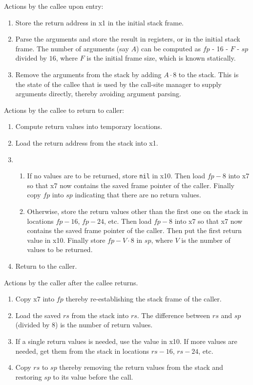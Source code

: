Actions by the callee upon entry:

\begin{enumerate}
\item Store the return address in x1 in the initial stack frame.
\item Parse the arguments and store the result in registers, or in the
  initial stack frame. The number of arguments (say $A$) can be
  computed as $fp$ - 16 - $F$ - $sp$ divided by $16$, where $F$ is the
  initial frame size, which is known statically.
\item Remove the arguments from the stack by adding $A \cdot 8$ to the
  stack.  This is the state of the callee that is used by the
  call-site manager to supply arguments directly, thereby avoiding
  argument parsing. 
\end{enumerate}

Actions by the callee to return to caller:

\begin{enumerate}
\item Compute return values into temporary locations.
\item Load the return address from the stack into x1.
\item
  \begin{enumerate}
  \item If no values are to be returned, store \texttt{nil} in x10.
    Then load $fp - 8$ into x7 so that x7 now contains the saved frame
    pointer of the caller.  Finally copy $fp$ into $sp$ indicating
    that there are no return values.
  \item Otherwise, store the return values other than the first one on
    the stack in locations $fp - 16$, $fp - 24$, etc.  Then load $fp -
    8$ into x7 so that x7 now contains the saved frame pointer of the
    caller.  Then put the first return value in x10.  Finally store
    $fp - V \cdot 8$ in $sp$, where $V$ is the number of values to be
    returned.
  \end{enumerate}
\item Return to the caller.
\end{enumerate}

Actions by the caller after the callee returns.

\begin{enumerate}
\item Copy x7 into $fp$ thereby re-establishing the stack frame of the
  caller.
\item Load the saved $rs$ from the stack into $rs$.  The difference
  between $rs$ and $sp$ (divided by 8) is the number of return
  values.
\item If a single return values is needed, use the value in x10.  If
  more values are needed, get them from the stack in locations $rs -
  16$, $rs-24$, etc.
\item Copy $rs$ to $sp$ thereby removing the return values from the
  stack and restoring $sp$ to its value before the call.
\end{enumerate}

